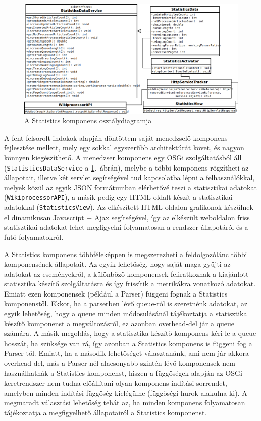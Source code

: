 \begin{figure}[htp]
\centering
\includegraphics[scale=0.45]{img/class_statistics}
\caption{A Statistics komponens osztálydiagramja}
\label{fig:class_statistics}
\end{figure}

A fent felsorolt indokok alapján döntöttem saját menedzselő komponens fejlesztése mellett, mely egy sokkal egyszerűbb architektúrát követ, és nagyon könnyen kiegészíthető. A menedzser komponens egy OSGi szolgáltatásból áll (\texttt{StatisticsDataService} a \ref{fig:class_statistics}.~ábrán), melybe a többi komponens rögzítheti az állapotait, illetve két servlet segítségével tud kapcsolatba lépni a felhasználókkal, melyek közül az egyik JSON formátumban elérhetővé teszi a statisztikai adatokat (\texttt{WikiprocessorAPI}), a másik pedig egy HTML oldalt készít a statisztikai adatokkal (\texttt{StatisticsView}). Az elkészített HTML oldalon grafikonok készülnek el dinamikusan Javascript + Ajax segítségével, így az elkészült weboldalon friss statisztikai adatokat lehet megfigyelni folyamatosan a rendszer állapotáról és a futó folyamatokról.

A Statistics komponens többféleképpen is megszerezheti a feldolgozólánc többi komponensének állapotait. Az egyik lehetőség, hogy saját maga gyűjti az adatokat az eseményekről, a különböző komponensek feliratkoznak a kiajánlott statisztika készítő szolgáltatásra és így frissítik a metrikákra vonatkozó adatokat. Emiatt ezen komponensek (például a Parser) függeni fognak a Statistics komponenstől. Ekkor, ha a parserben lévő queue-ról is szeretnénk adatokat, az egyik lehetőség, hogy a queue minden módosulásánál tájékoztatja a statisztika készítő komponenst a megváltozásról, ez azonban overhead-del jár a queue számára. A másik megoldás, hogy a statisztika készítő komponens kéri le a queue hosszát, ha szüksége van rá, így azonban a Statistics komponens is függeni fog a Parser-től. Emiatt, ha a második lehetőséget választanánk, ami nem jár akkora overhead-del, más a Parser-nél alacsonyabb szintén lévő komponensek nem használhatnák a Statistics komponenst, hiszen a függőségek alapján az OSGi keretrendszer nem tudna előállítani olyan komponens indítási sorrendet, amelyben minden indítási függőség kielégülne (függőségi hurok alakulna ki). A megmaradt választási lehetőség tehát az, ha minden komponens folyamatosan tájékoztatja a megfigyelhető állapotairól a Statistics komponenst.

